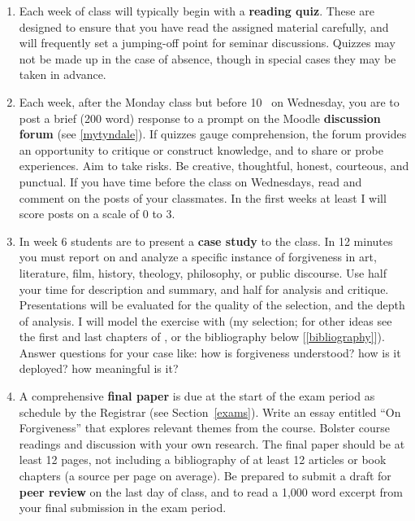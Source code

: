 \documentclass[titlepage]{article}
\begin{document}
\begin{enumerate}

	\item Each week of class will typically begin with a \textbf{reading
	quiz}. These are designed to ensure that you have read the assigned
	material carefully, and will frequently set a jumping-off point for
	seminar discussions. Quizzes may not be made up in the case of
	absence, though in special cases they may be taken in advance.

	\item Each week, after the Monday class but before 10 \AM\ on
	Wednesday, you are to post a brief (200 word) response to a prompt
	on the Moodle \textbf{discussion forum} (see \ref{mytyndale}). If
	quizzes gauge comprehension, the forum provides an opportunity to
	critique or construct knowledge, and to share or probe experiences.
	Aim to take risks. Be creative, thoughtful, honest, courteous, and
	punctual. If you have time before the class on Wednesdays, read and
	comment on the posts of your classmates. In the first weeks at least
	I will score posts on a scale of 0 to 3.

	\item In week 6 students are to present a \textbf{case study} to the
	class. In 12 minutes you must report on and analyze a specific
	instance of forgiveness in art, literature, film, history, theology,
	philosophy, or public discourse. Use half your time for description
	and summary, and half for analysis and critique. Presentations will
	be evaluated for the quality of the selection, and the depth of
	analysis. I will model the exercise with \cite{horn} (my selection;
	for other ideas see the first and last chapters of \cite{jones}, or
	the bibliography below [\ref{bibliography}]). Answer questions for
	your case like: how is forgiveness understood? how is it deployed?
	how meaningful is it?

	\item A comprehensive \textbf{final paper} is due at the start of
	the exam period as schedule by the Registrar (see
	Section~\ref{exams}). Write an essay entitled ``On Forgiveness''
	that explores relevant themes from the course. Bolster course
	readings and discussion with your own research. The final paper
	should be at least 12 pages, not including a bibliography of at
	least 12 articles or book chapters (a source per page on average).
	Be prepared to submit a draft for \textbf{peer review} on the last
	day of class, and to read a 1,000 word excerpt from your final
	submission in the exam period.

\end{enumerate}
\end{document}
